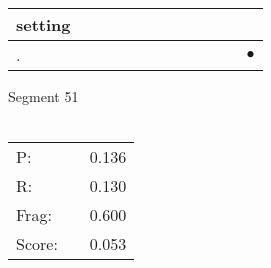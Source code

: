 \documentclass[landscape]{article}
\newcommand{\ssp}{\hspace{2pt}}
\newcommand{\mex}{\cellcolor{g}$\bullet$}
\begin{document}
\begin{tabular}{|l|p{10pt}|p{10pt}|p{10pt}|p{10pt}|p{10pt}|p{10pt}|p{10pt}|p{10pt}|p{10pt}|p{10pt}|p{10pt}|}
\hline
\ssp setting \ssp&\hspace{2pt}&\hspace{2pt}&\hspace{2pt}&\hspace{2pt}&\hspace{2pt}&\hspace{2pt}&\hspace{2pt}&\hspace{2pt}&\hspace{2pt}&\hspace{2pt}&\hspace{2pt}\\
\hline
\ssp \cellcolor{ref10}. \ssp&\hspace{2pt}&\hspace{2pt}&\hspace{2pt}&\hspace{2pt}&\hspace{2pt}&\hspace{2pt}&\hspace{2pt}&\hspace{2pt}&\hspace{2pt}&\hspace{2pt}&\hspace{2pt}\mex\\
\hline
\end{tabular}

\vspace{6pt}
\noindent Segment 51\\\\
\noindent\begin{tabular}{lm{12pt}r}
\hline
P:&&0.136\\
R:&&0.130\\
Frag:&&0.600\\
Score:&&0.053\\
\end{tabular}

\newpage
\end{document}
